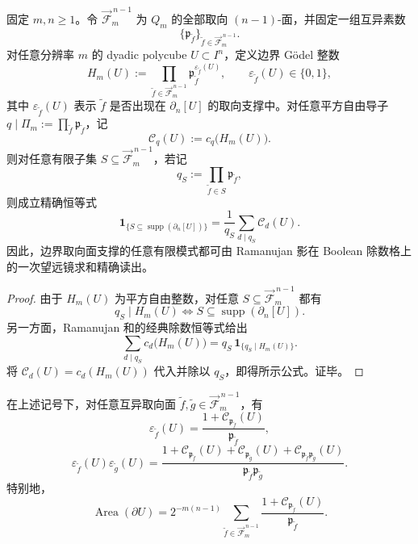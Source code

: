 \begin{theorem}\label{thm:conclusion-dyadic-boundary-primeshell-boolean-divisor-tomography}
固定 \(m,n\ge 1\)。令 \(\overrightarrow{\mathcal F}^{\,n-1}_m\) 为 \(Q_m\) 的全部取向 \((n-1)\)-面，并固定一组互异素数
\[
\{\mathfrak p_{\widetilde f}\}_{\widetilde f\in \overrightarrow{\mathcal F}^{\,n-1}_m}.
\]
对任意分辨率 \(m\) 的 dyadic polycube \(U\subset I^n\)，定义边界 Gödel 整数
\[
H_m(U):=
\prod_{\widetilde f\in \overrightarrow{\mathcal F}^{\,n-1}_m}
\mathfrak p_{\widetilde f}^{\varepsilon_{\widetilde f}(U)},
\qquad
\varepsilon_{\widetilde f}(U)\in\{0,1\},
\]
其中 \(\varepsilon_{\widetilde f}(U)\) 表示 \(\widetilde f\) 是否出现在 \(\partial_n[U]\) 的取向支撑中。对任意平方自由导子 \(q\mid \Pi_m:=\prod_{\widetilde f}\mathfrak p_{\widetilde f}\)，记
\[
\mathcal C_q(U):=c_q\!\bigl(H_m(U)\bigr).
\]
则对任意有限子集 \(S\subseteq \overrightarrow{\mathcal F}^{\,n-1}_m\)，若记
\[
q_S:=\prod_{\widetilde f\in S}\mathfrak p_{\widetilde f},
\]
则成立精确恒等式
\[
\mathbf 1_{\{S\subseteq \operatorname{supp}(\partial_n[U])\}}
=
\frac{1}{q_S}\sum_{d\mid q_S}\mathcal C_d(U).
\]
因此，边界取向面支撑的任意有限模式都可由 Ramanujan 影在 Boolean 除数格上的一次望远镜求和精确读出。
\end{theorem}

\begin{proof}
由于 \(H_m(U)\) 为平方自由整数，对任意 \(S\subseteq \overrightarrow{\mathcal F}^{\,n-1}_m\) 都有
\[
q_S\mid H_m(U)
\iff
S\subseteq \operatorname{supp}(\partial_n[U]).
\]
另一方面，Ramanujan 和的经典除数恒等式给出
\[
\sum_{d\mid q_S}c_d\!\bigl(H_m(U)\bigr)
=
q_S\,\mathbf 1_{\{q_S\mid H_m(U)\}}.
\]
将 \(\mathcal C_d(U)=c_d(H_m(U))\) 代入并除以 \(q_S\)，即得所示公式。证毕。
\end{proof}

\begin{corollary}\label{cor:conclusion-dyadic-boundary-primeshell-single-double-area-formulas}
在上述记号下，对任意互异取向面 \(\widetilde f,\widetilde g\in \overrightarrow{\mathcal F}^{\,n-1}_m\)，有
\[
\varepsilon_{\widetilde f}(U)
=
\frac{1+\mathcal C_{\mathfrak p_{\widetilde f}}(U)}{\mathfrak p_{\widetilde f}},
\]
\[
\varepsilon_{\widetilde f}(U)\varepsilon_{\widetilde g}(U)
=
\frac{
1+\mathcal C_{\mathfrak p_{\widetilde f}}(U)
+\mathcal C_{\mathfrak p_{\widetilde g}}(U)
+\mathcal C_{\mathfrak p_{\widetilde f}\mathfrak p_{\widetilde g}}(U)
}{
\mathfrak p_{\widetilde f}\mathfrak p_{\widetilde g}
}.
\]
特别地，
\[
\operatorname{Area}(\partial U)
=
2^{-m(n-1)}
\sum_{\widetilde f\in \overrightarrow{\mathcal F}^{\,n-1}_m}
\frac{1+\mathcal C_{\mathfrak p_{\widetilde f}}(U)}{\mathfrak p_{\widetilde f}}.
\]
\end{corollary}

